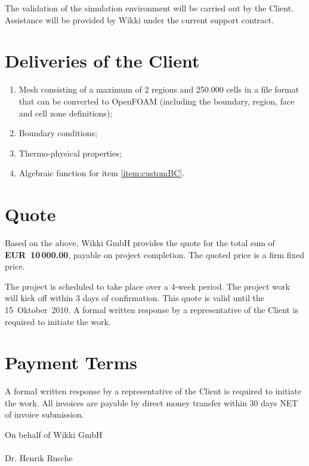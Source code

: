 The validation of the simulation environment will be carried out by the Client.
Assistance will be provided by Wikki under the current support contract.

\section*{Deliveries of the Client}

\begin{enumerate}
\item Mesh consisting of a maximum of 2 regions and 250.000 cells in a file
  format that can be converted to OpenFOAM (including the boundary, region, face
  and cell zone definitions);
\item Boundary conditions;
\item Thermo-physical properties;
\item Algebraic function for item \ref{item:customBC}.
\end{enumerate}

\newpage

\section*{Quote}

Based on the above, Wikki GmbH provides the quote for the total sum of
{\bfseries EUR~10\,000.00}, payable on project completion.  The quoted price is a
firm fixed price.


The project is scheduled to take place over a 4-week period.  The project work
will kick off within 3 days of confirmation.  This quote is valid until the
15~Oktober~2010.  A formal written response by a representative of the Client
is required to initiate the work.



\section*{Payment Terms}

A formal written response by a representative of the Client is required to
initiate the work. All invoices are payable by direct money transfer within 30
days NET of invoice submission.

\vspace{0.2in}
\begin{flushleft}
On behalf of Wikki GmbH\\
%
\vspace{3mm}
\quad{} \\
Dr. Henrik Rusche
\end{flushleft}

%
%

%

